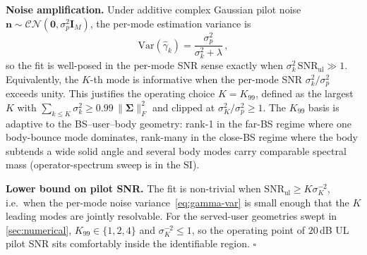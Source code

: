 \documentclass[journal,twocolumn,10pt]{IEEEtran}
\theoremstyle{plain}
\theoremstyle{definition}
\theoremstyle{remark}
\begin{document}
\textbf{Noise amplification.} Under additive complex Gaussian pilot
noise $\bm{n} \sim \mathcal{CN}(\bm{0},\sigma_p^2 \bm{I}_M)$,
the per-mode estimation variance is
\begin{equation}\label{eq:gamma-var}
  \mathrm{Var}(\hat\gamma_k)
    = \frac{\sigma_p^2}{\sigma_k^2 + \lambda}\,,
\end{equation}
so the fit is well-posed in the per-mode SNR
sense exactly when $\sigma_k^2 \,\mathrm{SNR}_{\mathrm{ul}}\gg 1$.
Equivalently, the $K$-th mode is informative when the per-mode SNR
$\sigma_k^2/\sigma_p^2$ exceeds unity. This justifies the operating
choice $K = K_{99}$, defined as the largest $K$ with
$\sum_{k\leq K}\sigma_k^2 \geq 0.99\,\|\bm{\Sigma}\|_F^2$ and
clipped at $\sigma_K^2 / \sigma_p^2 \geq 1$. The $K_{99}$ basis is
adaptive to the BS--user--body geometry: rank-1 in the far-BS regime
where one body-bounce mode dominates, rank-many in the close-BS
regime where the body subtends a wide solid angle and several body
modes carry comparable spectral mass (operator-spectrum sweep is in
the SI).

\textbf{Lower bound on pilot SNR.} The fit is non-trivial when
$\mathrm{SNR}_{\mathrm{ul}} \geq K\sigma_K^{-2}$, i.e.~when the
per-mode noise variance~\eqref{eq:gamma-var} is small enough that
the $K$ leading modes are jointly resolvable. For the served-user
geometries swept in \cref{sec:numerical}, $K_{99} \in \{1, 2, 4\}$
and $\sigma_K^{-2} \leq 1$, so the operating point of
$20\,$dB UL pilot SNR sits comfortably inside the identifiable
region. \hfill$\square$
\end{document}
